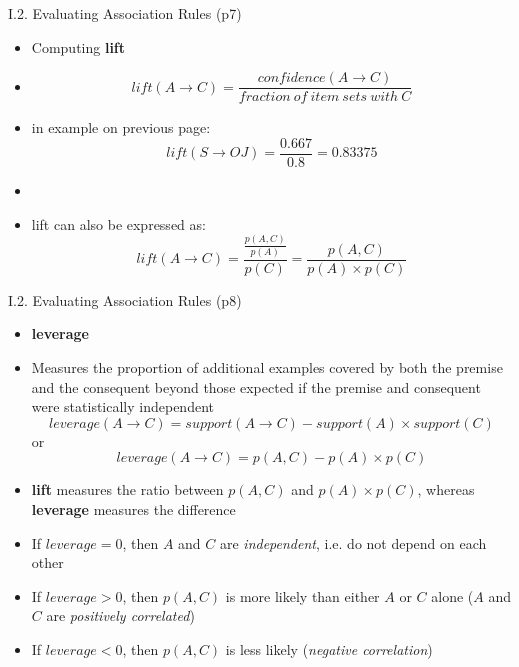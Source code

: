 \documentclass[handout]{beamer}
\newcommand{\stronger}[1]{\textbf{\color{purple} #1}}
\begin{document}
\begin{frame}{I.2. Evaluating Association Rules (p7)}
\begin{itemize}
\item Computing \stronger{lift} 
\item[]
\[
	lift( A \rightarrow C ) = 
	\frac{ confidence( A \rightarrow C ) }
	     { \mathit{ fraction~of~item~sets~with~C }}
\]
\item in example on previous page:
\[
	lift( S \rightarrow OJ ) = \frac{ 0.667 }{ 0.8 } = 0.83375
\]
\item[]
\item lift can also be expressed as:
\[
	lift( A \rightarrow C ) = 
	\frac{ \frac{ p(A,C) }{ p(A) }}{ p(C) } =
	\frac{ p(A,C) }{ p(A) \times p(C) }
\]
\end{itemize}
\end{frame}
\begin{frame}{I.2. Evaluating Association Rules (p8)}
\begin{itemize}
\item \stronger{leverage}
\item Measures the proportion of additional examples covered by both the premise and the consequent beyond those expected if the premise and consequent were statistically independent
\[
	leverage( A \rightarrow C ) = 
		support( A \rightarrow C ) - support( A ) \times support( C )
\]
or
\[
	leverage( A \rightarrow C ) = p(A,C) - p( A ) \times p( C )
\]
\item \textbf{lift} measures the ratio between $p(A,C)$ and $p(A) \times p(C)$, whereas \textbf{leverage} measures the difference
\item If $leverage = 0$, then $A$ and $C$ are \emph{independent}, i.e. do not depend on each other
\item If $leverage > 0$, then $p(A,C)$ is more likely than either $A$ or $C$ alone
($A$ and $C$ are \emph{positively correlated})
\item If $leverage < 0$, then $p(A,C)$ is less likely
(\emph{negative correlation})
\end{itemize}
\end{frame}
\end{document}
